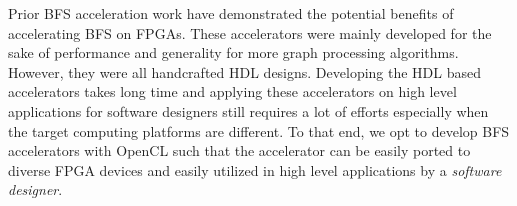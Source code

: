 Prior BFS acceleration work have demonstrated the potential benefits of accelerating 
BFS on FPGAs. These accelerators were mainly developed for the sake 
of performance and generality for more graph processing algorithms. 
However, they were all handcrafted HDL designs. Developing the HDL based accelerators 
takes long time and applying these accelerators 
on high level applications for software designers still requires a lot of 
efforts especially when the target computing platforms are different. 
To that end, we opt to develop BFS accelerators with OpenCL
such that the accelerator can be easily ported to diverse FPGA devices 
and easily utilized in high level applications 
by a \textit{software designer}.
